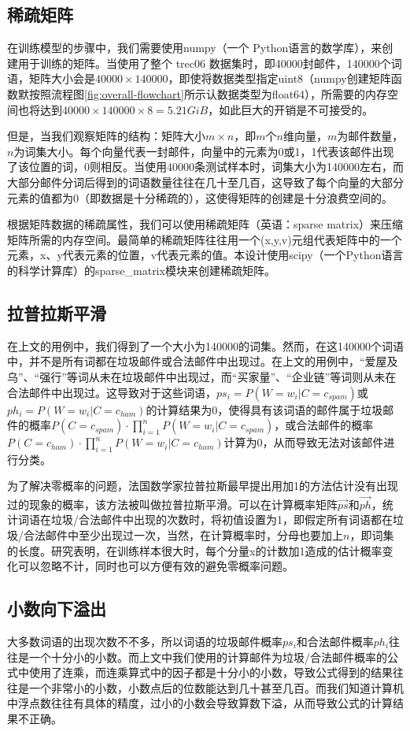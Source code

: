 \documentclass[UTF8,zihao=-4]{ctexart}
\newcommand{\upcite}[1]{\textsuperscript{\cite{#1}}}
\begin{document}
\subsection{稀疏矩阵}
	在训练模型的步骤中，我们需要使用numpy（一个 Python语言的数学库），来创建用于训练的矩阵。当使用了整个 trec06 数据集时，即40000封邮件，140000个词语，矩阵大小会是$40000\times140000$，即使将数据类型指定uint8（numpy创建矩阵函数默按照流程图\ref{fig:overall-flowchart}所示认数据类型为float64），所需要的内存空间也将达到$40000\times140000\times8=5.21GiB$，如此巨大的开销是不可接受的。
	
	但是，当我们观察矩阵的结构：矩阵大小$m\times n$，即$m$个$n$维向量，$m$为邮件数量，$n$为词集大小。每个向量代表一封邮件，向量中的元素为0或1，1代表该邮件出现了该位置的词，0则相反。当使用40000条测试样本时，词集大小为140000左右，而大部分邮件分词后得到的词语数量往往在几十至几百，这导致了每个向量的大部分元素的值都为0（即数据是十分稀疏的），这使得矩阵的创建是十分浪费空间的。
	
	根据矩阵数据的稀疏属性，我们可以使用稀疏矩阵（英语：sparse matrix）来压缩矩阵所需的内存空间。最简单的稀疏矩阵往往用一个(x,y,v)元组代表矩阵中的一个元素，x、y代表元素的位置，v代表元素的值。本设计使用scipy（一个Python语言的科学计算库）的sparse\_matrix模块来创建稀疏矩阵。
\subsection{拉普拉斯平滑}
	在上文的用例中，我们得到了一个大小为140000的词集。然而，在这140000个词语中，并不是所有词都在垃圾邮件或合法邮件中出现过。在上文的用例中，“爱屋及乌”、“强行”等词从未在垃圾邮件中出现过，而“买家量”、“企业链”等词则从未在合法邮件中出现过。这导致对于这些词语，$ps_i=P(W=w_i|C=c_{spam})$或$ph_i=P(W=w_i|C=c_{ham})$的计算结果为0，使得具有该词语的邮件属于垃圾邮件的概率$P(C=c_{spam}) \cdot \prod\limits_{i=1}^{n} P(W=w_i|C=c_{spam})$，或合法邮件的概率$P(C=c_{ham}) \cdot \prod\limits_{i=1}^{n} P(W=w_i|C=c_{ham})$计算为0，从而导致无法对该邮件进行分类。
	
	为了解决零概率的问题，法国数学家拉普拉斯最早提出用加1的方法估计没有出现过的现象的概率，该方法被叫做拉普拉斯平滑\upcite{nb-enhance}。可以在计算概率矩阵$\vec{ps}$和$\vec{ph}$，统计词语在垃圾/合法邮件中出现的次数时，将初值设置为1，即假定所有词语都在垃圾/合法邮件中至少出现过一次，当然，在计算概率时，分母也要加上$n$，即词集的长度。研究表明，在训练样本很大时，每个分量x的计数加1造成的估计概率变化可以忽略不计，同时也可以方便有效的避免零概率问题。
\subsection{小数向下溢出}
	大多数词语的出现次数不不多，所以词语的垃圾邮件概率$ps_i$和合法邮件概率$ph_i$往往是一个十分小的小数。而上文中我们使用的计算邮件为垃圾/合法邮件概率的公式中使用了连乘，而连乘算式中的因子都是十分小的小数，导致公式得到的结果往往是一个非常小的小数，小数点后的位数能达到几十甚至几百。而我们知道计算机中浮点数往往有具体的精度，过小的小数会导致算数下溢，从而导致公式的计算结果不正确。
	
\end{document}
